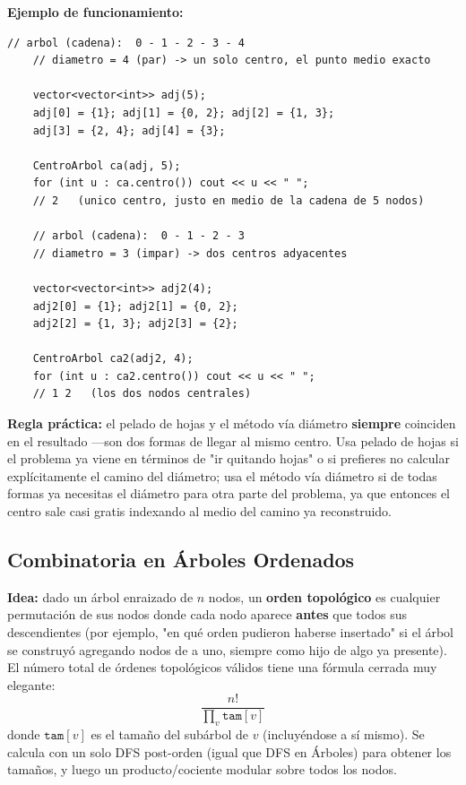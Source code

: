 \documentclass[10pt,a4paper,twocolumn]{article}
\begin{document}
\textbf{Ejemplo de funcionamiento:}

\begin{lstlisting}[style=cpp]
	// arbol (cadena):  0 - 1 - 2 - 3 - 4
	// diametro = 4 (par) -> un solo centro, el punto medio exacto
	
	vector<vector<int>> adj(5);
	adj[0] = {1}; adj[1] = {0, 2}; adj[2] = {1, 3};
	adj[3] = {2, 4}; adj[4] = {3};
	
	CentroArbol ca(adj, 5);
	for (int u : ca.centro()) cout << u << " ";
	// 2   (unico centro, justo en medio de la cadena de 5 nodos)
	
	// arbol (cadena):  0 - 1 - 2 - 3
	// diametro = 3 (impar) -> dos centros adyacentes
	
	vector<vector<int>> adj2(4);
	adj2[0] = {1}; adj2[1] = {0, 2};
	adj2[2] = {1, 3}; adj2[3] = {2};
	
	CentroArbol ca2(adj2, 4);
	for (int u : ca2.centro()) cout << u << " ";
	// 1 2   (los dos nodos centrales)
\end{lstlisting}

\textbf{Regla práctica:} el pelado de hojas y el método vía diámetro
\textbf{siempre} coinciden en el resultado —son dos formas de llegar
al mismo centro. Usa pelado de hojas si el problema ya viene en
términos de "ir quitando hojas" o si prefieres no calcular
explícitamente el camino del diámetro; usa el método vía diámetro si
de todas formas ya necesitas el diámetro para otra parte del
problema, ya que entonces el centro sale casi gratis indexando al
medio del camino ya reconstruido.

\subsection{Combinatoria en Árboles Ordenados}

\textbf{Idea:} dado un árbol enraizado de $n$ nodos, un
\textbf{orden topológico} es cualquier permutación de sus nodos donde
cada nodo aparece \textbf{antes} que todos sus descendientes (por
ejemplo, "en qué orden pudieron haberse insertado" si el árbol se
construyó agregando nodos de a uno, siempre como hijo de algo ya
presente). El número total de órdenes topológicos válidos tiene una
fórmula cerrada muy elegante:
$$\frac{n!}{\prod_{v} \texttt{tam}[v]}$$
donde $\texttt{tam}[v]$ es el tamaño del subárbol de $v$ (incluyéndose
a sí mismo). Se calcula con un solo DFS post-orden (igual que DFS en
Árboles) para obtener los tamaños, y luego un producto/cociente
modular sobre todos los nodos.
\end{document}
